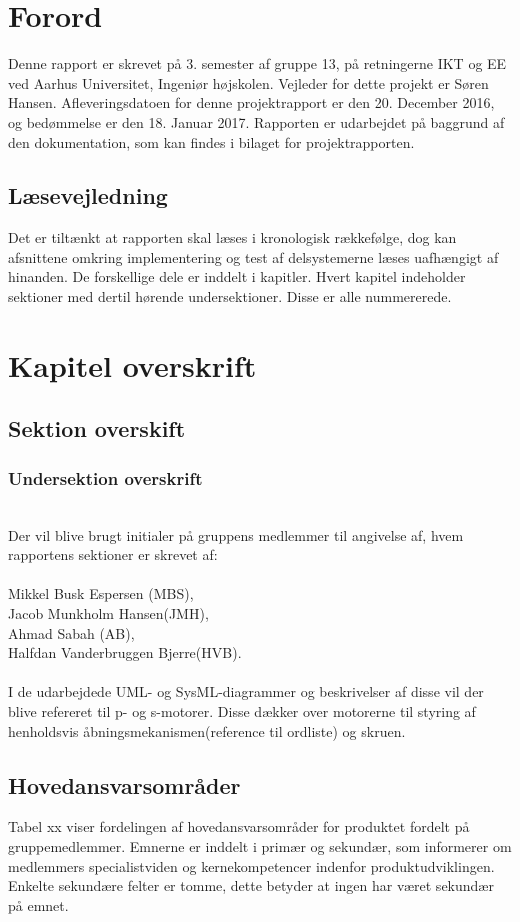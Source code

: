 \chapter{Forord}
Denne rapport er skrevet på 3. semester af gruppe 13, på retningerne IKT og EE ved Aarhus Universitet, Ingeniør højskolen. 
Vejleder for dette projekt er Søren Hansen. Afleveringsdatoen for denne projektrapport er den 20. December 2016, og bedømmelse er den 18. Januar 2017.
Rapporten er udarbejdet på baggrund af den dokumentation, som kan findes i bilaget for projektrapporten.

\section{Læsevejledning}
Det er tiltænkt at rapporten skal læses i kronologisk rækkefølge, dog kan afsnittene omkring implementering og test af delsystemerne læses
uafhængigt af hinanden. De forskellige dele er inddelt i kapitler. Hvert kapitel indeholder sektioner med dertil hørende undersektioner. Disse er alle nummererede.\\

\chapter{Kapitel overskrift}
\section{Sektion overskift}
\subsection{Undersektion overskrift}\\
Der vil blive brugt initialer på gruppens medlemmer til angivelse af, hvem rapportens sektioner er skrevet af: \\
\\
Mikkel Busk Espersen (MBS), \\
Jacob Munkholm Hansen(JMH), \\
Ahmad Sabah (AB), \\
Halfdan Vanderbruggen Bjerre(HVB). \\
\\
I de udarbejdede UML- og SysML-diagrammer og beskrivelser af disse vil der blive refereret til p- og s-motorer. Disse dækker over motorerne til styring af 
henholdsvis åbningsmekanismen(reference til ordliste) og skruen.

\section{Hovedansvarsområder}
Tabel xx viser fordelingen af hovedansvarsområder for produktet fordelt på gruppemedlemmer. Emnerne er inddelt i primær og sekundær, som informerer om 
medlemmers specialistviden og kernekompetencer indenfor produktudviklingen. Enkelte sekundære felter er tomme, dette betyder at ingen har været sekundær på 
emnet.\\

